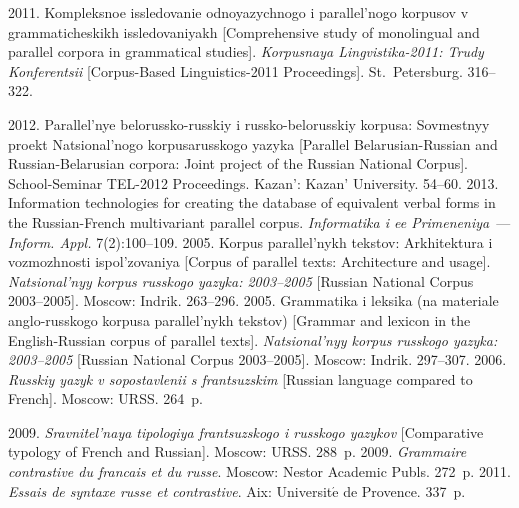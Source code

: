 \begin{multicols}{2}
{{\begin{thebibliography}{99}
 2011. Kompleksnoe issledovanie od\-no\-yazych\-no\-go i parallel'nogo korpusov v
grammaticheskikh issledovaniyakh [Comprehensive study of monolingual and
parallel corpora in grammatical studies].
\textit{Korpusnaya Lingvistika-2011: Trudy
Konferentsii} [Corpus-Based Linguistics-2011 Proceedings]. St.\ Petersburg. 316--322.

 2012. Pa\-ral\-lel'nye belorussko-russkiy i russko-belorusskiy kor\-pu\-sa: Sovmestnyy
proekt Natsional'nogo kor\-pu\-sa\linebreak russkogo yazyka [Parallel Belarusian-Russian and
Russian-Belarusian corpora: Joint project of the Russian National Corpus].
School-Seminar TEL-2012 Proceedings.
Kazan': Kazan' University. 54--60.
 2013. Information technologies for creating the database of equivalent verbal
 forms in the Russian-French multivariant parallel corpus.
 \textit{Informatika i ee Primeneniya}~--- \textit{Inform. Appl.}
 7(2):100--109.
 2005. Korpus parallel'nykh tekstov: Arkhitektura i vozmozhnosti ispol'zovaniya
[Corpus of parallel texts: Architecture and usage].
\textit{Natsional'nyy korpus russkogo
yazyka: 2003--2005} [Russian National Corpus 2003--2005]. Moscow: Indrik.
263--296.
 2005. Grammatika i leksika (na materiale anglo-russkogo korpusa parallel'nykh
tekstov) [Grammar and lexicon in the English-Russian corpus of parallel texts].
\textit{Natsional'nyy korpus russkogo yazyka: 2003--2005} [Russian National Corpus
2003--2005]. Moscow: Indrik. 297--307.
 2006. \textit{Russkiy yazyk v sopostavlenii s frantsuzskim}
 [Russian language compared to French]. Moscow: URSS. 264~p.
 
\columnbreak

 2009. \textit{Sravnitel'naya tipologiya frantsuzskogo i russkogo yazykov}
 [Comparative typology of French and Russian]. Moscow: URSS. 288~p.
 2009.
\textit{Grammaire contrastive du francais et du russe}.
Moscow: Nestor Academic Publs. 272~p.
 2011. \textit{Essais de syntaxe russe et contrastive}.
 Aix: Universit$\acute{\mbox{e}}$ de Provence. 337~p.



\end{thebibliography}}}
\end{multicols}
